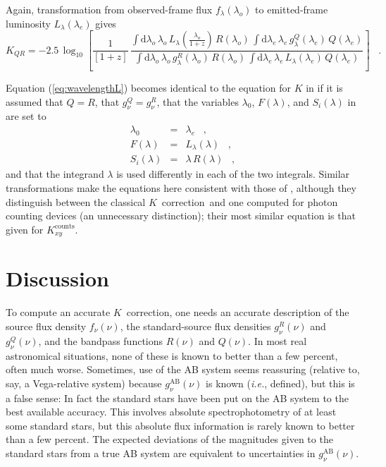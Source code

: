 \documentclass[preprint]{aastex}
\newcommand{\kcorrection}{$K$~correction}
\newcommand{\lambdaobs}{\lambda_o}
\newcommand{\lambdaemit}{\lambda_e}
\newcommand{\latin}[1]{\textsl{#1}}
\providecommand{\ie}{\latin{i.e.}}
\begin{document}
Again, transformation from observed-frame flux
$f_{\lambda}(\lambdaobs)$ to emitted-frame luminosity
$L_{\lambda}(\lambdaemit)$ gives
\begin{equation}
\label{eq:wavelengthL}
K_{QR} = -2.5\,\log_{10}\left[\frac{1}{[1+z]}\,
  \frac{\displaystyle
  \int\mathrm{d}\lambdaobs\,\lambdaobs\,L_{\lambda}\!\left(\frac{\lambdaobs}{1+z}\right)\,R(\lambdaobs)\,
    \int\mathrm{d}\lambdaemit\,\lambdaemit\,
    g^Q_{\lambda}(\lambdaemit)\,Q(\lambdaemit)}
       {\displaystyle
  \int\mathrm{d}\lambdaobs\,\lambdaobs\,g^R_{\lambda}(\lambdaobs)\,R(\lambdaobs)\,
    \int\mathrm{d}\lambdaemit\,\lambdaemit\,
    L_{\lambda}(\lambdaemit)\,Q(\lambdaemit)}
\right] \;\;\;.
\end{equation}

Equation (\ref{eq:wavelengthL}) becomes identical to the equation for
$K$ in \citet{oke68a} if it is assumed that $Q=R$, that
$g^Q_{\nu}=g^R_{\nu}$, that the variables $\lambda_0$,
$F(\lambda)$, and $S_i(\lambda)$ in \citet{oke68a} are set to
\begin{eqnarray}\displaystyle
\lambda_0 & = & \lambdaemit \;\;\;, \nonumber \\
F(\lambda) & = & L_{\lambda}(\lambda) \;\;\;, \nonumber \\
S_i(\lambda) & = & \lambda\,R(\lambda) \;\;\;,
\end{eqnarray}
and that the integrand $\lambda$ is used differently in each of the
two integrals.  Similar transformations make the equations here
consistent with those of \citet{kim96a}, although they distinguish
between the classical \kcorrection\ and one computed for photon
counting devices (an unnecessary distinction); their most similar
equation is that given for $K^\mathrm{counts}_{xy}$.

\section{Discussion}

To compute an accurate \kcorrection, one needs an accurate description
of the source flux density $f_{\nu}(\nu)$, the standard-source flux
densities $g^R_{\nu}(\nu)$ and $g^Q_{\nu}(\nu)$, and the bandpass
functions $R(\nu)$ and $Q(\nu)$.  In most real astronomical
situations, none of these is known to better than a few percent, often
much worse.  Sometimes, use of the AB system seems reassuring
(relative to, say, a Vega-relative system) because
$g^\mathrm{AB}_{\nu}(\nu)$ is known (\ie, defined), but this is a false
sense: In fact the standard stars have been put on the AB system to
the best available accuracy.  This involves absolute spectrophotometry
of at least some standard stars, but this absolute flux information is
rarely known to better than a few percent.  The expected deviations of
the magnitudes given to the standard stars from a true AB system are
equivalent to uncertainties in $g^\mathrm{AB}_{\nu}(\nu)$.
\end{document}
